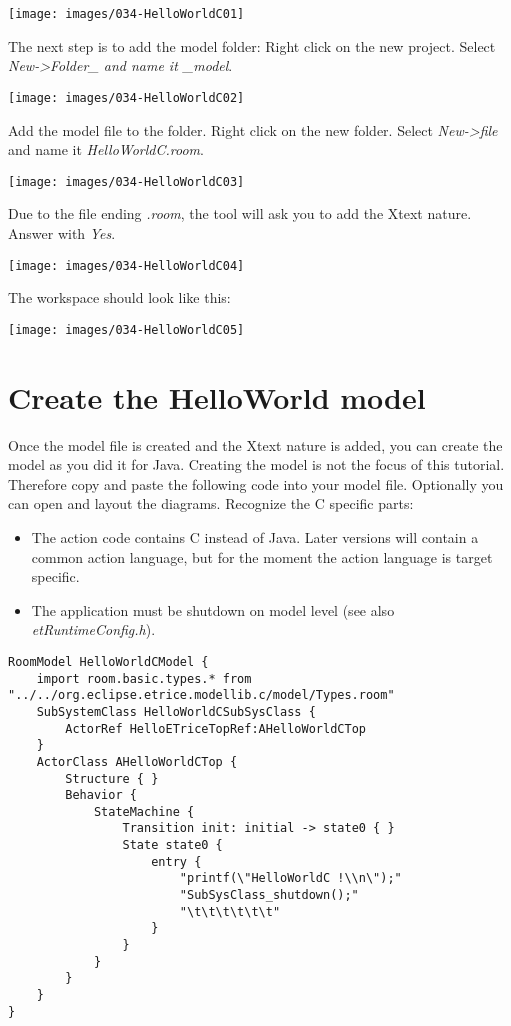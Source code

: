 \texttt{[image: images/034-HelloWorldC01]}

The next step is to add the model folder:
Right click on the new project. Select \textit{New->Folder_ and name it _model}.

\texttt{[image: images/034-HelloWorldC02]}

Add the model file to the folder. Right click on the new folder. Select \textit{New->file} and name it \textit{HelloWorldC.room}.

\texttt{[image: images/034-HelloWorldC03]}

Due to the file ending \textit{.room}, the tool will ask you to add the Xtext nature. Answer with \textit{Yes}. 

\texttt{[image: images/034-HelloWorldC04]}

The workspace should look like this:

\texttt{[image: images/034-HelloWorldC05]}



\section{Create the HelloWorld model}

Once the model file is created and the Xtext nature is added, you can create the model as you did it for Java.
Creating the model is not the focus of this tutorial. Therefore copy and paste the following code into your model file. Optionally you can open and layout the diagrams.  
Recognize the C specific parts:
\begin{itemize}
\item The action code contains C instead of Java. Later versions will contain a common action language, but for the moment the action language is target specific.
\item The application must be shutdown on model level (see also \textit{etRuntimeConfig.h}).  
\end{itemize}

\begin{verbatim} 
RoomModel HelloWorldCModel {
	import room.basic.types.* from "../../org.eclipse.etrice.modellib.c/model/Types.room"
	SubSystemClass HelloWorldCSubSysClass {
		ActorRef HelloETriceTopRef:AHelloWorldCTop 
	}
	ActorClass AHelloWorldCTop {
		Structure { }
		Behavior {
			StateMachine {
				Transition init: initial -> state0 { }
				State state0 {
					entry {
						"printf(\"HelloWorldC !\\n\");"
						"SubSysClass_shutdown();"
						"\t\t\t\t\t\t"
					}
				}
			}
		}
	}	
}
\end{verbatim}

